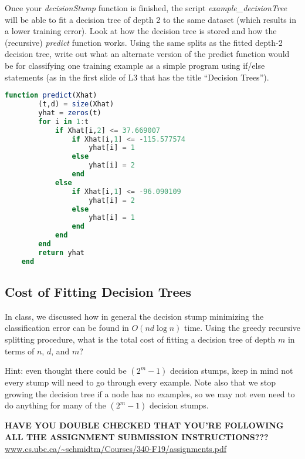 \documentclass{article}
\def\blu#1{{\color{blu}#1}}
\begin{document}
Once your \emph{decisionStump} function is finished, the script \emph{example\_decisionTree} will be able to fit a decision tree of depth 2 to the same dataset (which results in a lower training error). Look at how the decision tree is stored and how the (recursive) \emph{predict} function works. \blu{Using the same splits as the fitted depth-2 decision tree, write out what an alternate version of the predict function would be for classifying one training example as a simple program using if/else statements (as in the first slide of L3 that has the title ``Decision Trees'').}

\begin{lstlisting}[language=julia]
	function predict(Xhat)
		(t,d) = size(Xhat)
		yhat = zeros(t)
		for i in 1:t
			if Xhat[i,2] <= 37.669007
				if Xhat[i,1] <= -115.577574
					yhat[i] = 1
				else
					yhat[i] = 2
				end
			else
				if Xhat[i,1] <= -96.090109
					yhat[i] = 2
				else
					yhat[i] = 1
				end
			end
		end
		return yhat
	end
\end{lstlisting}

\subsection{Cost of Fitting Decision Trees}

In class, we discussed how in general the decision stump minimizing the classification error can be found in $O(nd\log n)$ time. Using the greedy recursive splitting procedure, \blu{what is the total cost of fitting a decision tree of depth $m$ in terms of $n$, $d$, and $m$?} 

Hint: even thought there could be $(2^m-1)$ decision stumps, keep in mind not every stump will need to go through every example. Note also that we stop growing the decision tree if a node has no examples, so we may not even need to do anything for many of the $(2^m-1)$ decision stumps.

\vspace{25pt}
\textbf{HAVE YOU DOUBLE CHECKED THAT YOU'RE FOLLOWING ALL THE ASSIGNMENT SUBMISSION INSTRUCTIONS???}\\
\url{www.cs.ubc.ca/~schmidtm/Courses/340-F19/assignments.pdf}
\end{document}
